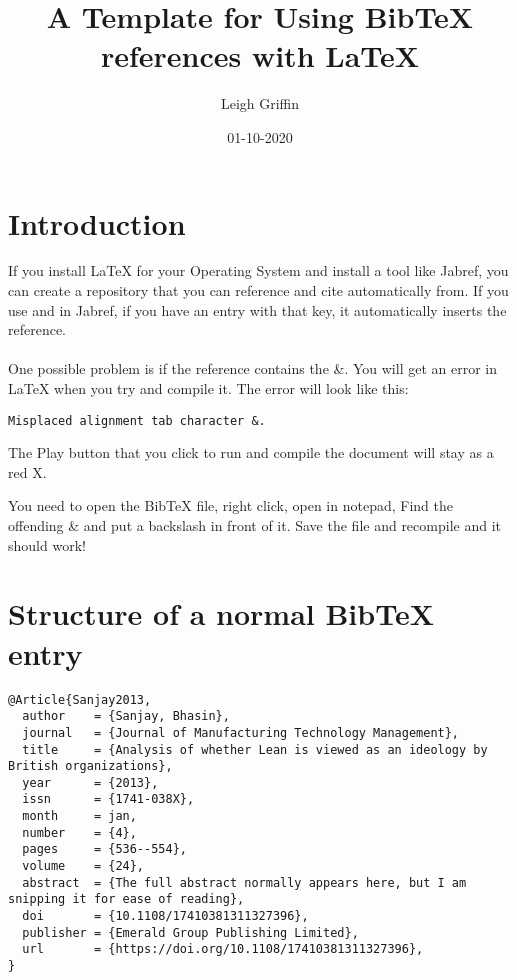 \documentclass[12pt]{article}
\begin{document}
\title{A Template for Using BibTeX references with LaTeX}
\author{Leigh Griffin}
\date{01-10-2020}

\maketitle


\section{Introduction}
If you install LaTeX for your Operating System and install a tool like Jabref, you can create a repository that you can reference and cite automatically from.
If you use \cite{Sanjay2013} and in Jabref, if you have an entry with that key, it automatically inserts the reference. \\ \\

One possible problem is if the reference contains the \&. You will get an error in LaTeX when you try and compile it. The error will look like this:

\begin{lstlisting}
Misplaced alignment tab character &.
\end{lstlisting}

The Play button that you click to run and compile the document will stay as a red X.

You need to open the BibTeX file, right click, open in notepad,
Find the offending \& and put a backslash in front of it. Save the file and recompile and it should work!

\section{Structure of a normal BibTeX entry}

\begin{lstlisting}
@Article{Sanjay2013,
  author    = {Sanjay, Bhasin},
  journal   = {Journal of Manufacturing Technology Management},
  title     = {Analysis of whether Lean is viewed as an ideology by British organizations},
  year      = {2013},
  issn      = {1741-038X},
  month     = jan,
  number    = {4},
  pages     = {536--554},
  volume    = {24},
  abstract  = {The full abstract normally appears here, but I am snipping it for ease of reading},
  doi       = {10.1108/17410381311327396},
  publisher = {Emerald Group Publishing Limited},
  url       = {https://doi.org/10.1108/17410381311327396},
}

\end{lstlisting}
\end{document}
